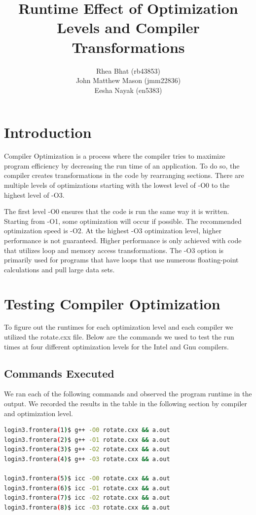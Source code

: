 \documentclass{report}
\begin{document}
\title{Runtime Effect of Optimization Levels and Compiler Transformations}
\author{Rhea Bhat (rb43853) \\ John Matthew Mason (jmm22836) \\ Eesha Nayak (en5383)}
\maketitle

\section*{Introduction}
Compiler Optimization is a process where the compiler tries to maximize program efficiency by decreasing the run time of an application. To do so, the compiler creates transformations in the code by rearranging sections. There are multiple levels of optimizations starting with the lowest level of -O0 to the highest level of -O3. 

The first level -O0 ensures that the code is run the same way it is written. Starting from -O1, some optimization will occur if possible. The recommended optimization speed is -O2. At the highest -O3 optimization level, higher performance is not guaranteed. Higher performance is only achieved with code that utilizes loop and memory access transformations. The -O3 option is primarily used for programs that have loops that use numerous floating-point calculations and pull large data sets.

\section*{Testing Compiler Optimization}
To figure out the runtimes for each optimization level and each compiler we utilized the rotate.cxx file. Below are the commands we used to test the run times at four different optimization levels for the Intel and Gnu compilers.

\subsection*{Commands Executed}

We ran each of the following commands and observed the program runtime in the output.  We recorded the results in the table in the following section by compiler and optimization level.

\begin{lstlisting}[language=bash]
login3.frontera(1)$ g++ -O0 rotate.cxx && a.out
login3.frontera(2)$ g++ -O1 rotate.cxx && a.out
login3.frontera(3)$ g++ -O2 rotate.cxx && a.out
login3.frontera(4)$ g++ -O3 rotate.cxx && a.out

login3.frontera(5)$ icc -O0 rotate.cxx && a.out
login3.frontera(6)$ icc -O1 rotate.cxx && a.out
login3.frontera(7)$ icc -O2 rotate.cxx && a.out
login3.frontera(8)$ icc -O3 rotate.cxx && a.out
\end{lstlisting}
\end{document}
